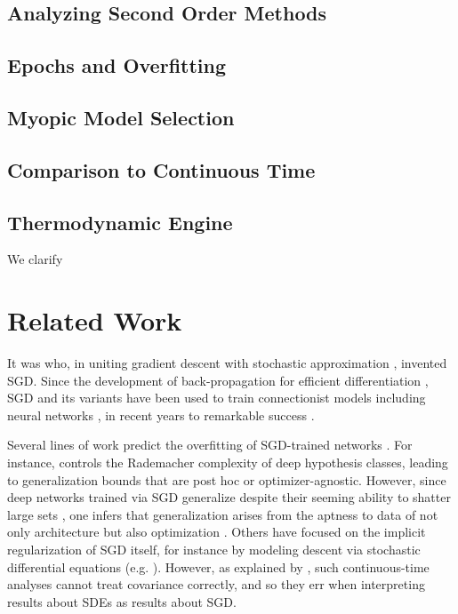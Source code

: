 \documentclass{article}
\begin{document}
\subsection*{Analyzing Second Order Methods}

\subsection*{Epochs and Overfitting}

\subsection*{Myopic Model Selection}

\subsection*{Comparison to Continuous Time}

\subsection*{Thermodynamic Engine}
    We clarify  


\section{Related Work}
    It was \citet{ki52} who, in uniting gradient descent \citep{ca47} with
    stochastic approximation \citep{ro51}, invented SGD.  Since the development
    of back-propagation for efficient differentiation \citep{we74}, SGD and its
    variants have been used to train connectionist models including neural
    networks \citep{bo91}, in recent years to remarkable success \citep{le15}.

    Several lines of work predict the overfitting of SGD-trained networks
    \citep{ne17a}.  For instance, \citet{ba17} controls the Rademacher
    complexity of deep hypothesis classes, leading to generalization bounds
    that are post hoc or optimizer-agnostic.  However, since deep networks
    trained via SGD generalize despite their seeming ability to shatter large
    sets \citep{zh17}, one infers that generalization arises from the aptness
    to data of not only architecture but also optimization \citep{ne17b}.
    Others have focused on the implicit regularization of SGD itself, for
    instance by modeling descent via stochastic differential equations (e.g.
    \citet{ch18}).  However, as explained by \citet{ya19}, such continuous-time
    analyses cannot treat covariance correctly, and so they err when
    interpreting results about SDEs as results about SGD.
\end{document}
